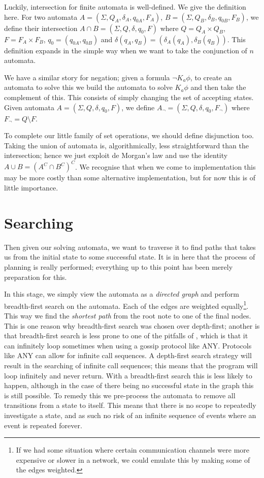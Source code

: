 \documentclass[10pt, a4paper]{report}
\begin{document}
Luckily, intersection for finite automata is well-defined. We give the
definition here. For two automata $A = (\Sigma, Q_A, \delta_A, q_{0A}, F_A)$, $B
= (\Sigma, Q_B, \delta_B, q_{0B}, F_B)$, we define their intersection $A \cap B
= (\Sigma, Q, \delta, q_0, F)$ where $Q = Q_A \times Q_B$, $F = F_A \times F_B$,
$q_0 = (q_{0A}, q_{0B})$ and $\delta(q_A, q_B) = (\delta_A(q_A),
\delta_B(q_B))$. This definition expands in the simple way when we want to take
the conjunction of $n$ automata.

We have a similar story for negation; given a formula $\neg K_a \phi$, to create
an automata to solve this we build the automata to solve $K_a \phi$ and then
take the complement of this. This consists of simply changing the set of
accepting states. Given automata $A = (\Sigma, Q, \delta, q_0, F)$, we define
$A_\neg = (\Sigma, Q, \delta, q_0, F_\neg)$ where $F_\neg = Q \setminus F$.

To complete our little family of set operations, we should define disjunction
too. Taking the union of automata is, algorithmically, less straightforward than
the intersection; hence we just exploit de Morgan's law and use the identity $A
\cup B = (A^C \cap B^C)^C$. We recognise that when we come to implementation
this may be more costly than some alternative implementation, but for now this
is of little importance. 

\section{Searching}

Then given our solving automata, we want to traverse it to find paths that takes
us from the initial state to some successful state. It is in here that the
process of planning is really performed; everything up to this point has been
merely preparation for this. 

In this stage, we simply view the automata as a \emph{directed graph} and
perform breadth-first search on the automata. Each of the edges are weighted
equally\footnote{If we had some situation where certain communication channels
  were more expensive or slower in a network, we could emulate this by making
  some of the edges weighted.}. This way we find the \emph{shortest path} from
the root note to one of the final nodes. This is one reason why breadth-first
search was chosen over depth-first; another is that breadth-first search is
less prone to one of the pitfalls of \cite{GithubGossip}, which is that it can
infinitely loop sometimes when using a gossip protocol like \textsf{ANY}.
Protocols like \textsf{ANY} can allow for infinite call sequences. A depth-first
search strategy will result in the searching of infinite call sequences; this
means that the program will loop infinitely and never return. With a
breadth-first search this is less likely to happen, although in the case of
there being no successful state in the graph this is still possible. To remedy
this we pre-process the automata to remove all transitions from a state to
itself. This means that there is no scope to repeatedly investigate a state, and
as such no risk of an infinite sequence of events where an event is repeated
forever.
\end{document}
